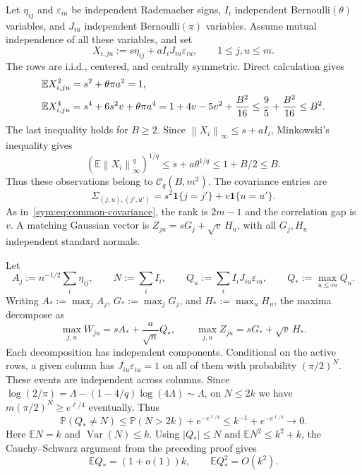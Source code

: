 \documentclass[11pt,letterpaper]{article}
\theoremstyle{remark}
\newcommand{\E}{\mathbb E}
\newcommand{\Pp}{\mathbb P}
\newcommand{\Var}{\operatorname{Var}}
\newcommand{\norm}[1]{\left\lVert#1\right\rVert}
\newcommand{\ind}{\mathbf 1}
\begin{document}
Let \(\eta_{ij}\) and \(\varepsilon_{iu}\) be independent Rademacher
signs, \(I_i\) independent Bernoulli\((\theta)\) variables, and
\(J_{iu}\) independent Bernoulli\((\pi)\) variables. Assume mutual
independence of all these variables, and set
\begin{equation}
 X_{i,ju}:=s\eta_{ij}+aI_iJ_{iu}\varepsilon_{iu},
 \qquad 1\le j,u\le m.
 \label{q4:eq:sparse-construction}
\end{equation}
The rows are i.i.d., centered, and centrally symmetric. Direct
calculation gives
\begin{align}
 \E X_{i,ju}^2&=s^2+\theta\pi a^2=1,\notag\\
 \E X_{i,ju}^4
 &=s^4+6s^2v+\theta\pi a^4
   =1+4v-5v^2+\frac{B^2}{16}
   \le\frac95+\frac{B^2}{16}\le B^2.
 \label{q4:eq:sparse-coordinate-moments}
\end{align}
The last inequality holds for \(B\ge2\). Since
\(\norm{X_i}_\infty\le s+aI_i\), Minkowski's inequality gives
\begin{equation}
 (\E\norm{X_i}_\infty^q)^{1/q}
 \le s+a\theta^{1/q}\le1+B/2\le B.
 \label{q4:eq:sparse-envelope-moment}
\end{equation}
Thus these observations belong to \(\mathcal C_q(B,m^2)\).
The covariance entries are
\[
 \Sigma_{(j,u),(j',u')}=s^2\ind\{j=j'\}+v\ind\{u=u'\}.
\]
As in~\eqref{sym:eq:common-covariance}, the rank is \(2m-1\)
and the correlation gap is \(v\). A matching Gaussian vector is
\(Z_{ju}=sG_j+\sqrt v\,H_u\), with all \(G_j,H_u\)
independent standard normals.

Let
\[
 A_j:=n^{-1/2}\sum_i\eta_{ij},\qquad N:=\sum_iI_i,\qquad
 Q_u:=\sum_iI_iJ_{iu}\varepsilon_{iu},\qquad Q_*:=\max_{u\le m}Q_u.
\]
Writing \(A_*:=\max_jA_j\), \(G_*:=\max_jG_j\), and
\(H_*:=\max_uH_u\), the maxima decompose as
\begin{equation}
 \max_{j,u}W_{ju}=sA_*+\frac a{\sqrt n}Q_*,
 \qquad
 \max_{j,u}Z_{ju}=sG_*+\sqrt v\,H_*.
 \label{q4:eq:sparse-maxima}
\end{equation}
Each decomposition has independent components. Conditional on the
active rows, a given column has \(J_{iu}\varepsilon_{iu}=1\)
on all of them with probability \((\pi/2)^N\). These events are
independent across columns. Since
\(\log(2/\pi)=\Lambda-(1-4/q)\log(4\Lambda)\sim\Lambda\),
on \(N\le2k\) we have \(m(\pi/2)^N\ge e^{\ell/4}\) eventually. Thus
\[
 \Pp(Q_*\ne N)\le\Pp(N>2k)+e^{-e^{\ell/4}}
 \le k^{-1}+e^{-e^{\ell/4}}\longrightarrow0.
\]
Here \(\E N=k\) and \(\Var(N)\le k\).
Using \(|Q_*|\le N\) and \(\E N^2\le k^2+k\), the
Cauchy--Schwarz argument from the preceding proof gives
\begin{equation}
 \E Q_*=(1+o(1))k,\qquad \E Q_*^2=O(k^2).
 \label{q4:eq:sparse-max-moments}
\end{equation}
\end{document}
